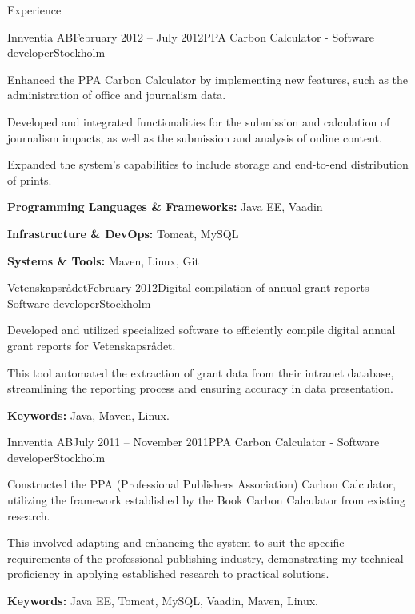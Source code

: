 \documentclass{resume}
\begin{document}
\begin{rSection}{Experience}
    \begin{rSubsection}{Innventia AB}{February 2012 -- July 2012}{PPA Carbon Calculator - Software developer}{Stockholm}
      \item Enhanced the PPA Carbon Calculator by implementing new features, such as the administration of office and journalism data.
      \item Developed and integrated functionalities for the submission and calculation of journalism impacts, as well as the submission and analysis of online content.
      \item Expanded the system's capabilities to include storage and end-to-end distribution of prints.
      \item \textbf{Programming Languages \& Frameworks:} Java EE, Vaadin
      \item \textbf{Infrastructure \& DevOps:} Tomcat, MySQL
      \item \textbf{Systems \& Tools:} Maven, Linux, Git
    \end{rSubsection}

    \begin{rSubsection}{Vetenskapsrådet}{February 2012}{Digital compilation of annual grant reports - Software developer}{Stockholm}
      \item Developed and utilized specialized software to efficiently compile digital annual grant reports for Vetenskapsrådet.
      \item This tool automated the extraction of grant data from their intranet database, streamlining the reporting process and ensuring accuracy in data presentation.
      \item \textbf{Keywords:} Java, Maven, Linux.
    \end{rSubsection}

    \begin{rSubsection}{Innventia AB}{July 2011 -- November 2011}{PPA Carbon Calculator - Software developer}{Stockholm}
      \item Constructed the PPA (Professional Publishers Association) Carbon Calculator, utilizing the framework established by the Book Carbon Calculator from existing research.
      \item This involved adapting and enhancing the system to suit the specific requirements of the professional publishing industry, demonstrating my technical proficiency in applying established research to practical solutions.
      \item \textbf{Keywords:} Java EE, Tomcat, MySQL, Vaadin, Maven, Linux.
    \end{rSubsection}
  \end{rSection}
\end{document}
